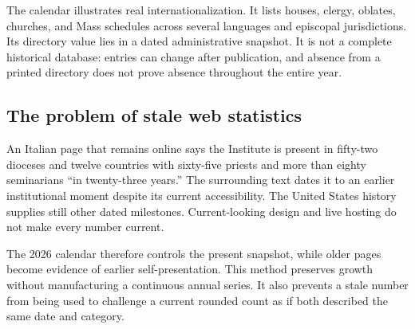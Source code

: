 The calendar illustrates real internationalization. It lists houses, clergy, oblates, churches, and Mass schedules across several languages and episcopal jurisdictions. Its directory value lies in a dated administrative snapshot. It is not a complete historical database: entries can change after publication, and absence from a printed directory does not prove absence throughout the entire year.

\subsection{The problem of stale web statistics}

An Italian page that remains online says the Institute is present in fifty-two dioceses and twelve countries with sixty-five priests and more than eighty seminarians ``in twenty-three years.'' The surrounding text dates it to an earlier institutional moment despite its current accessibility. The United States history supplies still other dated milestones. Current-looking design and live hosting do not make every number current.

The 2026 calendar therefore controls the present snapshot, while older pages become evidence of earlier self-presentation. This method preserves growth without manufacturing a continuous annual series. It also prevents a stale number from being used to challenge a current rounded count as if both described the same date and category.


